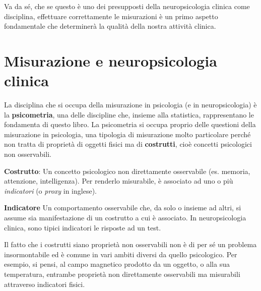 \documentclass[
  italian,
  letterpaper,
  paper=A4,
  headinclude=on,
  footinclude=on,
  12pt]{scrbook}
\begin{document}
Va da sé, che se questo è uno dei presupposti della neuropsicologia
clinica come disciplina, effettuare correttamente le misurazioni è un
primo aspetto fondamentale che determinerà la qualità della nostra
attività clinica.

\section{Misurazione e neuropsicologia
clinica}\label{misurazione_e_neuropsicologia_clinica}

La disciplina che si occupa della misurazione in psicologia (e in
neuropsicologia) è la \textbf{psicometria}, una delle discipline che,
insieme alla statistica, rappresentano le fondamenta di questo libro. La
psicometria si occupa proprio delle questioni della misurazione in
psicologia, una tipologia di misurazione molto particolare perché non
tratta di proprietà di oggetti fisici ma di \textbf{costrutti}, cioè
concetti psicologici non osservabili.

\begin{tcolorbox}[enhanced jigsaw, left=2mm, colbacktitle=quarto-callout-note-color!10!white, bottomrule=.15mm, opacityback=0, coltitle=black, colframe=quarto-callout-note-color-frame, opacitybacktitle=0.6, leftrule=.75mm, colback=white, toprule=.15mm, title=\textcolor{quarto-callout-note-color}{\faInfo}\hspace{0.5em}{Definizione}, titlerule=0mm, arc=.35mm, breakable, rightrule=.15mm, bottomtitle=1mm, toptitle=1mm]

\textbf{Costrutto}: Un concetto psicologico non direttamente osservabile
(es. memoria, attenzione, intelligenza). Per renderlo misurabile, è
associato ad uno o più \emph{indicatori} (o \emph{proxy} in inglese).
\vspace{1em}

\textbf{Indicatore} Un comportamento osservabile che, da solo o insieme
ad altri, si assume sia manifestazione di un costrutto a cui è
associato. In neuropsicologia clinica, sono tipici indicatori le
risposte ad un test.

\end{tcolorbox}

Il fatto che i costrutti siano proprietà non osservabili non è di per sé
un problema insormontabile ed è comune in vari ambiti diversi da quello
psicologico. Per esempio, si pensi, al campo magnetico prodotto da un
oggetto, o alla sua temperatura, entrambe proprietà non direttamente
osservabili ma misurabili attraverso indicatori fisici.
\end{document}
